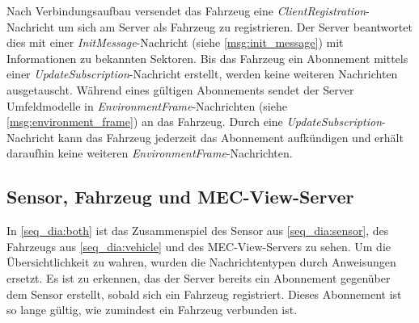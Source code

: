 Nach Verbindungsaufbau versendet das Fahrzeug eine \textit{ClientRegistration}-Nachricht um sich am Server als Fahrzeug zu registrieren.
Der Server beantwortet dies mit einer \textit{InitMessage}-Nachricht (siehe \autoref{msg:init_message}) mit Informationen zu bekannten Sektoren.
Bis das Fahrzeug ein Abonnement mittels einer \textit{UpdateSubscription}-Nachricht erstellt, werden keine weiteren Nachrichten ausgetauscht.
Während eines gültigen Abonnements sendet der Server Umfeldmodelle in \textit{EnvironmentFrame}-Nachrichten (siehe \autoref{msg:environment_frame}) an das Fahrzeug.
Durch eine \textit{UpdateSubscription}-Nachricht kann das Fahrzeug jederzeit das Abonnement aufkündigen und erhält daraufhin keine weiteren \textit{EnvironmentFrame}-Nachrichten.

\subsection{Sensor, Fahrzeug und MEC-View-Server}

In \autoref{seq_dia:both} ist das Zusammenspiel des Sensor aus \autoref{seq_dia:sensor}, des Fahrzeugs aus \autoref{seq_dia:vehicle} und des MEC-View-Servers zu sehen.
Um die Übersichtlichkeit zu wahren, wurden die Nachrichtentypen durch Anweisungen ersetzt.
Es ist zu erkennen, das der Server bereits ein Abonnement gegenüber dem Sensor erstellt, sobald sich ein Fahrzeug registriert.
Dieses Abonnement ist so lange gültig, wie zumindest ein Fahrzeug verbunden ist.

